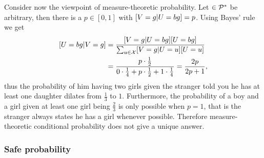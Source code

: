 \documentclass[a4paper]{report}
\theoremstyle{plain}
\theoremstyle{definition}
\theoremstyle{remark}
\numberwithin{equation}{chapter}
\let\P\relax
\DeclareMathOperator{\P}{\mathbb{P}}
\DeclareMathOperator{\1}{\mathbbm{1}}
\newcommand{\X}{\mathcal{X}}
\newcommand{\Pmod}{\mathcal{P}^*}
\begin{document}
Consider now the viewpoint of measure-theoretic probability. Let $\P\in\Pmod$ be arbitrary, then there is a $p\in[0,1]$ with $\P[V=g|U=bg]=p$. Using Bayes' rule we get
\begin{align}
\P[U=bg|V=g]&=\frac{\P[V=g|U=bg]\P[U=bg]}{\sum_{u\in\X}\P[V=g|U=u]\P[U=u]}\\
&=\frac{p\cdot\frac{1}{2}}{0\cdot\frac{1}{4}+p\cdot\frac{1}{2}+1\cdot\frac{1}{4}}=\frac{2p}{2p+1},
\end{align}
thus the probability of him having two girls given the stranger told you he has at least one daughter dilates from $\frac{1}{3}$ to $1$. Furthermore, the probability of a boy and a girl given at least one girl being $\frac{2}{3}$ is only possible when $p=1$, that is the stranger always states he has a girl whenever possible. Therefore measure-theoretic conditional probability does not give a unique answer.

\subsubsection{Safe probability}
\end{document}
